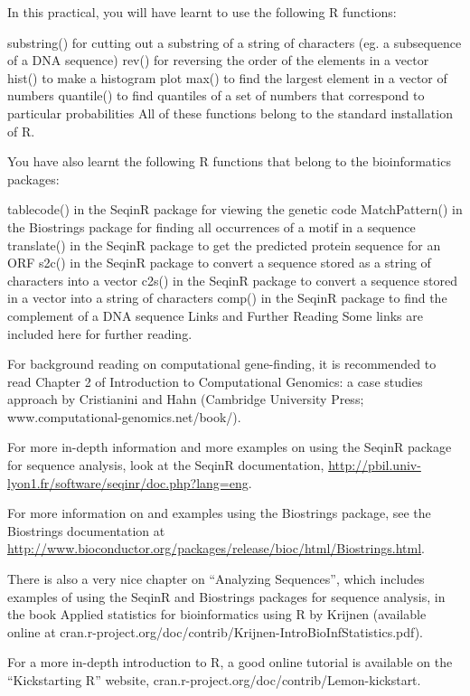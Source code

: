 \documentclass[
]{book}
\begin{document}
In this practical, you will have learnt to use the following R functions:

substring() for cutting out a substring of a string of characters (eg. a subsequence of a DNA sequence)
rev() for reversing the order of the elements in a vector
hist() to make a histogram plot
max() to find the largest element in a vector of numbers
quantile() to find quantiles of a set of numbers that correspond to particular probabilities
All of these functions belong to the standard installation of R.

You have also learnt the following R functions that belong to the bioinformatics packages:

tablecode() in the SeqinR package for viewing the genetic code
MatchPattern() in the Biostrings package for finding all occurrences of a motif in a sequence
translate() in the SeqinR package to get the predicted protein sequence for an ORF
s2c() in the SeqinR package to convert a sequence stored as a string of characters into a vector
c2s() in the SeqinR package to convert a sequence stored in a vector into a string of characters
comp() in the SeqinR package to find the complement of a DNA sequence
Links and Further Reading
Some links are included here for further reading.

For background reading on computational gene-finding, it is recommended to read Chapter 2 of Introduction to Computational Genomics: a case studies approach by Cristianini and Hahn (Cambridge University Press; www.computational-genomics.net/book/).

For more in-depth information and more examples on using the SeqinR package for sequence analysis, look at the SeqinR documentation, \url{http://pbil.univ-lyon1.fr/software/seqinr/doc.php?lang=eng}.

For more information on and examples using the Biostrings package, see the Biostrings documentation at \url{http://www.bioconductor.org/packages/release/bioc/html/Biostrings.html}.

There is also a very nice chapter on ``Analyzing Sequences'', which includes examples of using the SeqinR and Biostrings packages for sequence analysis, in the book Applied statistics for bioinformatics using R by Krijnen (available online at cran.r-project.org/doc/contrib/Krijnen-IntroBioInfStatistics.pdf).

For a more in-depth introduction to R, a good online tutorial is available on the ``Kickstarting R'' website, cran.r-project.org/doc/contrib/Lemon-kickstart.
\end{document}

